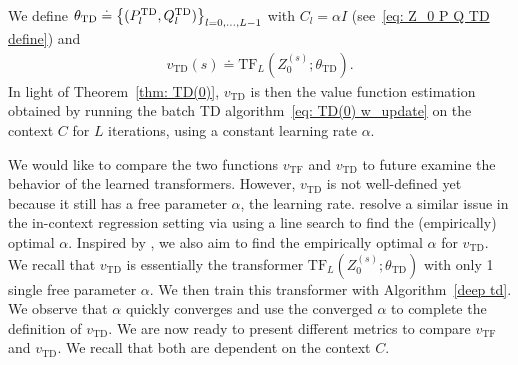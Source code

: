\documentclass{article}
\newcommand{\fS}{\mathcal{S}}
\newcommand{\R}{\mathbb{R}}
\newcommand{\tf}{\text{TF}}
\newcommand{\td}{\text{TD}}
\begin{document}
We define $\theta_\td \doteq \qty{(P_l^\td, Q_l^\td)}_{l=0,\dots, L-1}$ with $C_l = \alpha I$ (see~\eqref{eq: Z_0 P Q TD define}) and
\begin{align}
    v_\td(s) \doteq \tf_L(Z_0^{(s)}; \theta_\td).
\end{align}
In light of Theorem~\ref{thm: TD(0)},
$v_\td$ is then the value function estimation obtained by running the batch TD algorithm~\eqref{eq: TD(0) w_update} on the context $C$ for $L$ iterations,
using a constant learning rate $\alpha$.

We would like to compare the two functions $v_\tf$ and $v_\td$ to future examine the behavior of the learned transformers.
However,
$v_\td$ is not well-defined yet because it still has a free parameter $\alpha$,
the learning rate.
\cite{vonoswald2023transformers} resolve a similar issue in the in-context regression setting 
via using a line search to find the (empirically) optimal $\alpha$.
Inspired by \cite{vonoswald2023transformers},
we also aim to find the empirically optimal $\alpha$ for $v_\td$.
We recall that $v_\td$ is essentially the transformer $\tf_L(Z_0^{(s)}; \theta_\td)$ with only 1 single free parameter $\alpha$.
We then train this transformer with Algorithm~\ref{deep td}. 
We observe that $\alpha$ quickly converges and use the converged $\alpha$ to complete the definition of $v_\td$.
We are now ready to present different metrics to compare $v_\tf$ and $v_\td$.
We recall that both are dependent on the context $C$.
\end{document}
